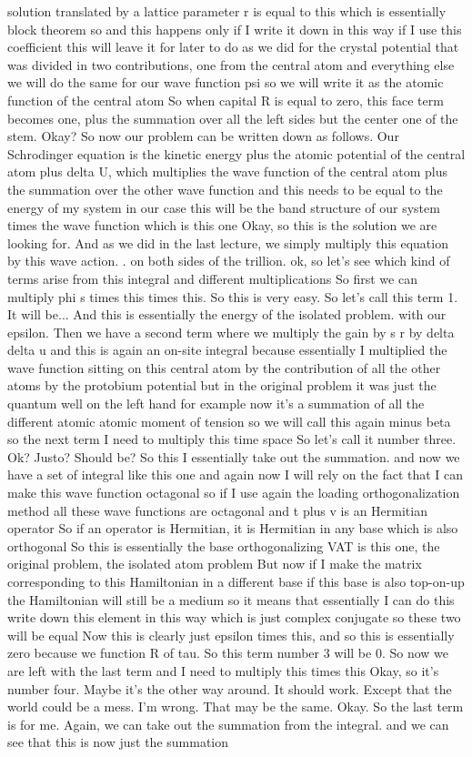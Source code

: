 solution translated by a lattice parameter r is equal to this which is essentially block theorem so and this happens only if I write it down in this way if I use this coefficient this will leave it for later to do as we did for the crystal potential that was divided in two contributions, one from the central atom and everything else we will do the same for our wave function psi so we will write it as the atomic function of the central atom So when capital R is equal to zero, this face term becomes one, plus the summation over all the left sides but the center one of the stem. Okay? So now our problem can be written down as follows. Our Schrodinger equation is the kinetic energy plus the atomic potential of the central atom plus delta U, which multiplies the wave function of the central atom plus the summation over the other wave function and this needs to be equal to the energy of my system in our case this will be the band structure of our system times the wave function which is this one Okay, so this is the solution we are looking for. And as we did in the last lecture, we simply multiply this equation by this wave action. . on both sides of the trillion. ok, so let's see which kind of terms arise from this integral and different multiplications So first we can multiply phi s times this times this. So this is very easy. So let's call this term 1. It will be... And this is essentially the energy of the isolated problem. with our epsilon. Then we have a second term where we multiply the gain by s r by delta delta u and this is again an on-site integral because essentially I multiplied the wave function sitting on this central atom by the contribution of all the other atoms by the protobium potential but in the original problem it was just the quantum well on the left hand for example now it's a summation of all the different atomic atomic moment of tension so we will call this again minus beta so the next term I need to multiply this time space So let's call it number three. Ok? Justo? Should be? So this I essentially take out the summation. and now we have a set of integral like this one and again now I will rely on the fact that I can make this wave function octagonal so if I use again the loading orthogonalization method all these wave functions are octagonal and t plus v is an Hermitian operator So if an operator is Hermitian, it is Hermitian in any base which is also orthogonal So this is essentially the base orthogonalizing VAT is this one, the original problem, the isolated atom problem But now if I make the matrix corresponding to this Hamiltonian in a different base if this base is also top-on-up the Hamiltonian will still be a medium so it means that essentially I can do this write down this element in this way which is just complex conjugate so these two will be equal Now this is clearly just epsilon times this, and so this is essentially zero because we function R of tau. So this term number 3 will be 0. So now we are left with the last term and I need to multiply this times this Okay, so it's number four. Maybe it's the other way around. It should work. Except that the world could be a mess. I'm wrong. That may be the same. Okay. So the last term is for me. Again, we can take out the summation from the integral. and we can see that this is now just the summation 
